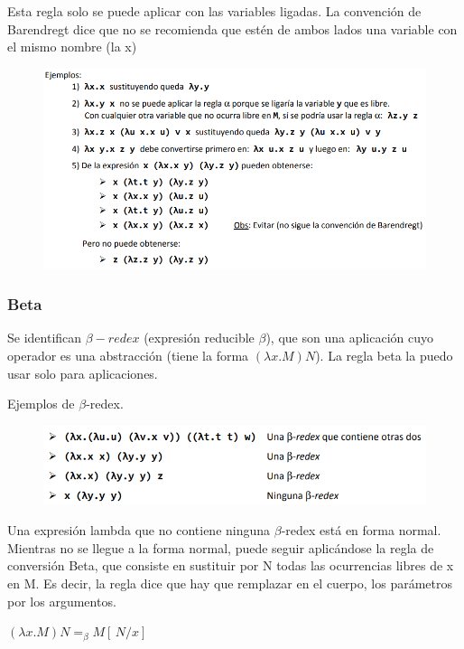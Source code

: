 Esta regla solo se puede aplicar con las variables ligadas. 
La convención de Barendregt dice que no se recomienda que estén de ambos lados una variable con el mismo nombre (la x)

\begin{figure}[!htb]
    \centering
    \includegraphics[width=\textwidth]{img/EjemplosConversionAlfa.PNG}
\end{figure}

\newpage 

\subsubsection*{Beta}
Se identifican $\beta-redex$ (expresión reducible $\beta$), que son una aplicación cuyo operador es una abstracción (tiene la forma $(\lambda x.M) N$). La regla beta la puedo usar solo para aplicaciones.

Ejemplos de $\beta$-redex.
\begin{figure}[!htb]
    \centering
    \includegraphics[width=\textwidth]{img/EjemplosBetaRedex.PNG}
\end{figure}

Una expresión lambda que no contiene ninguna $\beta$-redex está en forma normal. Mientras no se llegue a la forma normal, puede seguir aplicándose la regla de conversión Beta, que consiste en sustituir por N todas las ocurrencias libres de x en M. Es decir, la regla dice que hay que remplazar en el cuerpo, los parámetros por los argumentos.

\begin{center}
\begin{math}
(\lambda x.M) N =_{\beta} M[\,N/x]\,
\end{math}  
\end{center}

